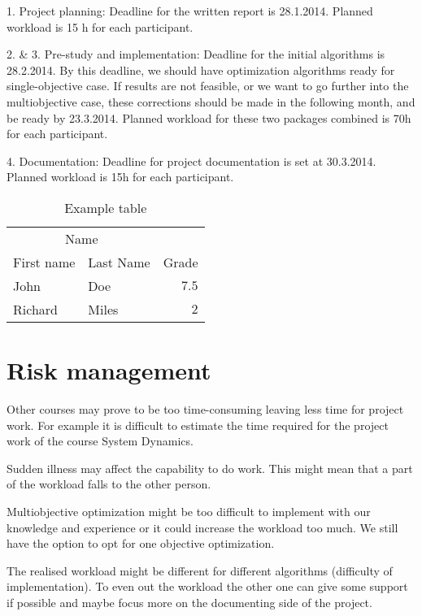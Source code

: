 \documentclass[twoside]{article}
\begin{document}
\begin{multicols}{2}
1. Project planning:
Deadline for the written report is 28.1.2014. Planned workload is 15 h for each participant.

2. \& 3. Pre-study and implementation:
Deadline for the initial algorithms is 28.2.2014. By this deadline, we should have optimization algorithms ready for single-objective case. If results are not feasible, or we want to go further into the multiobjective case, these corrections should be made in the following month, and be ready by 23.3.2014. Planned workload for these two packages combined is 70h for each participant.

4. Documentation:
Deadline for project documentation is set at 30.3.2014. Planned workload is 15h for each participant.


\begin{table}[H]
\caption{Example table}
\centering
\begin{tabular}{llr}
\toprule
\multicolumn{2}{c}{Name} \\
\cmidrule(r){1-2}
First name & Last Name & Grade \\
\midrule
John & Doe & $7.5$ \\
Richard & Miles & $2$ \\
\bottomrule
\end{tabular}
\end{table}




\section{Risk management}
Other courses may prove to be too time-consuming leaving less time for project work. For example it is difficult to estimate the time required for the project work of the course System Dynamics.

Sudden illness may affect the capability to do work. This might mean that a part of the workload falls to the other person.

Multiobjective optimization might be too difficult to implement with our knowledge and experience or it could increase the workload too much. We still have the option to opt for one objective optimization.

The realised workload might be different for different algorithms (difficulty of implementation). To even out the workload the other one can give some support if possible and maybe focus more on the documenting side of the project.


\end{multicols}
\end{document}
